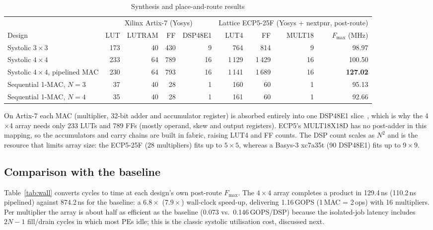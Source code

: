 \documentclass[conference]{IEEEtran}
\begin{document}
\begin{table}[t]
\centering
\caption{Synthesis and place-and-route results}
\label{tab:res}
\begin{tabular}{@{}lrrrrrrrr@{}}
\toprule
& \multicolumn{4}{c}{Xilinx Artix-7 (Yosys)} & \multicolumn{4}{c}{Lattice ECP5-25F (Yosys + nextpnr, post-route)}\\
\cmidrule(lr){2-5}\cmidrule(l){6-9}
Design & LUT & LUTRAM & FF & DSP48E1 & LUT4 & FF & MULT18 & $F_{\max}$ (MHz)\\
\midrule
Systolic $3\times3$                 & 173 & 40 & 430 & 9  & 764   & 814   & 9  & 98.97\\
Systolic $4\times4$                 & 233 & 64 & 789 & 16 & 1\,129 & 1\,429 & 16 & 100.50\\
Systolic $4\times4$, pipelined MAC  & 230 & 64 & 793 & 16 & 1\,141 & 1\,689 & 16 & \textbf{127.02}\\
Sequential 1-MAC, $N=3$             & 37  & 40 & 28  & 1  & 160   & 60    & 1  & 95.13\\
Sequential 1-MAC, $N=4$             & 35  & 40 & 28  & 1  & 161   & 60    & 1  & 92.66\\
\bottomrule
\end{tabular}
\end{table}

On Artix-7 each MAC (multiplier, 32-bit adder and accumulator register) is
absorbed entirely into one DSP48E1 slice~\cite{xilinx2018dsp48}, which is why
the 4$\times$4 array needs only 233 LUTs and 789 FFs (mostly operand,
skew and output registers). ECP5's MULT18X18D has no post-adder in this
mapping, so the accumulators and carry chains are built in fabric, raising
LUT4 and FF counts. The DSP count scales as $N^2$ and is the resource that
limits array size: the ECP5-25F (28 multipliers) fits up to $5\times5$,
whereas a Basys-3 xc7a35t (90 DSP48E1) fits up to $9\times9$.

\subsection{Comparison with the baseline}
Table~\ref{tab:wall} converts cycles to time at each design's own post-route
$F_{\max}$. The $4\times4$ array completes a product in 129.4\,ns (110.2\,ns
pipelined) against 874.2\,ns for the baseline: a $6.8\times$ ($7.9\times$)
wall-clock speed-up, delivering 1.16\,GOPS (1\,MAC = 2\,ops) with 16 multipliers.
Per multiplier the array is about half as efficient as the baseline
(0.073 vs.\ 0.146\,GOPS/DSP) because the isolated-job latency includes
$2N-1$ fill/drain cycles in which most PEs idle; this is the classic
systolic utilisation cost, discussed next.
\end{document}
